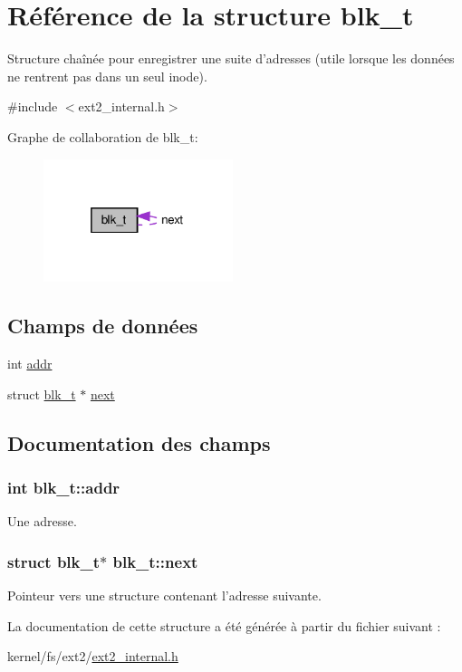 \hypertarget{structblk__t}{\section{\-Référence de la structure blk\-\_\-t}
\label{structblk__t}
}


\-Structure chaînée pour enregistrer une suite d'adresses (utile lorsque les données ne rentrent pas dans un seul inode).  




{\ttfamily \#include $<$ext2\-\_\-internal.\-h$>$}



\-Graphe de collaboration de blk\-\_\-t\-:
\nopagebreak
\begin{figure}[H]
\begin{center}
\leavevmode
\includegraphics[width=157pt]{structblk__t__coll__graph}
\end{center}
\end{figure}
\subsection*{\-Champs de données}
\begin{DoxyCompactItemize}
\item 
int \hyperlink{structblk__t_a7c19dc926a0c8d6bf7bb5b2fe88f8ad6}{addr}
\item 
struct \hyperlink{structblk__t}{blk\-\_\-t} $\ast$ \hyperlink{structblk__t_abd7c7af776e8fbe8b366247a859da088}{next}
\end{DoxyCompactItemize}


\subsection{\-Documentation des champs}
\hypertarget{structblk__t_a7c19dc926a0c8d6bf7bb5b2fe88f8ad6}{
\subsubsection[{addr}]{\setlength{\rightskip}{0pt plus 5cm}int {\bf blk\-\_\-t\-::addr}}}\label{structblk__t_a7c19dc926a0c8d6bf7bb5b2fe88f8ad6}
\-Une adresse. \hypertarget{structblk__t_abd7c7af776e8fbe8b366247a859da088}{
\subsubsection[{next}]{\setlength{\rightskip}{0pt plus 5cm}struct {\bf blk\-\_\-t}$\ast$ {\bf blk\-\_\-t\-::next}}}\label{structblk__t_abd7c7af776e8fbe8b366247a859da088}
\-Pointeur vers une structure contenant l'adresse suivante. 

\-La documentation de cette structure a été générée à partir du fichier suivant \-:\begin{DoxyCompactItemize}
\item 
kernel/fs/ext2/\hyperlink{ext2__internal_8h}{ext2\-\_\-internal.\-h}\end{DoxyCompactItemize}
